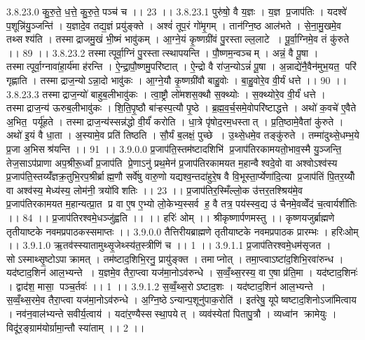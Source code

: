3.8.23.0
कु॒रु॒ते॒ ध॒त्ते॒ कु॒रु॒ते॒ पञ्च॑ च ।। 23 ।।
3.8.23.1
पुरु॑षो॒ वै य॒ज्ञः । य॒ज्ञ प्र॒जाप॑तिः । यदश्वे॑ प॒शून्नि॑यु॒ञ्जन्ति॑ । य॒ज्ञादे॒व तद्य॒ज्ञं प्रयु॑ङ्क्ते । अश्वं॑ तूप॒रं गो॑मृ॒गम् । तान॑ग्नि॒ष्ठ आल॑भते । से॒ना॒मु॒खमे॒व तथ्सश्य॑ति । तस्माद्राजमु॒खं भी॒ष्मं भावु॑कम् । आ॒ग्ने॒यं कृ॒ष्णग्री॑वं पु॒रस्ताल्ल॒लाटे । पू॒र्वा॒ग्निमे॒व तं कु॑रुते ।। 89 ।।
3.8.23.2
तस्मात्पूर्वा॒ग्निं पु॒रस्तात्स्थापयन्ति । पौ॒ष्णम॒न्वञ्चम् । अन्नं॒ वै पू॒षा । तस्मात्पूर्वा॒ग्नावा॑हा॒र्य॑मा ह॑रन्ति । ऐ॒न्द्रा॒पौ॒ष्णमु॒परि॑ष्टात् । ऐ॒न्द्रो वै रा॑ज॒न्योऽन्नं॑ पू॒षा । अ॒न्नाद्ये॑नै॒वैन॑मुभ॒यत॒ परि॑ गृह्णाति । तस्माद्राज॒न्योऽन्ना॒दो भावु॑कः । आ॒ग्ने॒यौ कृ॒ष्णग्री॑वौ बाहु॒वोः । बा॒हु॒वोरे॒व वी॒र्यं धत्ते ।। 90 ।।
3.8.23.3
तस्माद्राज॒न्यो॑ बाहुब॒लीभावु॑कः । त्वा॒ष्ट्रौ लो॑मशस॒क्थौ स॒क्थ्योः । स॒क्थ्योरे॒व वी॒र्यं॑ धत्ते । तस्माद्राज॒न्य॑ ऊरुब॒लीभावु॑कः । शि॒ति॒पृ॒ष्ठौ बा॑ऱ्हस्प॒त्यौ पृ॒ष्ठे । ब्र॒ह्म॒व॒र्च॒समे॒वोपरि॑ष्टाद्धत्ते । अथो॑ क॒वचे॑ ए॒वैते अ॒भित॒ पर्यू॑हते । तस्माद्राज॒न्य॑स्सन्न॑द्धो वी॒र्यं॑ करोति । धा॒त्रे पृ॑षोद॒रम॒धस्तात् । प्र॒ति॒ष्ठामे॒वैतां कु॑रुते । अथो॑ इ॒यं वै धा॒ता । अ॒स्यामे॒व प्रति॑ तिष्ठति । सौ॒र्यं ब॒लक्षं॒ पुच्छे । उ॒थ्से॒धमे॒व तङ्कु॑रुते । तम्मा॑दुथ्से॒धम्भ॒ये प्र॒जा अ॒भिसश्र॑यन्ति ।। 91 ।।
3.9.0.0
प्र॒जाप॑ति॒स्तम॑ष्टादशिभि॑ प्र॒जाप॑तिरकामयतो॒भाव॒स्मै यु॒ञ्जन्ति॒ तेज॒साऽप॑प्राणा अप॒श्रीरू॒र्ध्वां प्र॒जाप॑ति प्रे॒णाऽनु॑ प्रथ॒मेन॑ प्र॒जाप॑तिरकामयत म॒हान्वैश्वदे॒वो वा अश्वोऽश्व॑स्य प्र॒जाप॑ति॒स्तय्यँ॑ज्ञक्र॒तुभि॒रप॒श्रीर्ब्राह्म॒णौ सर्वे॑षु वारु॒णो यद्यश्व॒न्तदा॑हुरे॒ष वै वि॒भूस्ता॒र्प्येणा॑दि॒त्या प्र॒जाप॑तिं पि॒तर॒य्योँ वा अश्व॑स्य॒ मेध्य॑स्य॒ लोम॑नी॒ त्रयो॑विशतिः ।। 23 ।। प्र॒जाप॑तिर॒स्मिँल्लो॒क उ॑त्तर॒तश्श्रिय॑मे॒व प्र॒जाप॑तिरकामयत म॒हान्यत्प्रा॒त प्र वा ए॒ष ए॒भ्यो लो॒केभ्य॒स्सर्व॑ ह॒ वै तत्र॒ पय॑स्स्व॒द्य उ॑ चैनमे॒वव्वेँद॑ च॒त्वार्यशी॑तिः ।। 84 ।। प्र॒जाप॑तिरश्वमे॒धञ्जु॑ह्वति ।। ।। हरिः॑ ओम् ।। श्रीकृष्णार्पणमस्तु ।। कृष्णयजुर्ब्राह्मणे तृतीयाष्टके नवमप्रपाठकस्समाप्तः ।।
3.9.0.0
तैत्तिरीयब्राह्मणे तृतीयाष्टके नवमप्रपाठक प्रारम्भः । हरिःओम् ।।
3.9.1.0
ऋ॒तव॑स्स्यातामुथ्सृ॒जेथ्स्य॑त॒स्त्रीणि॑ च ।। 1 ।।
3.9.1.1
प्र॒जाप॑तिरश्वमे॒धम॑सृजत । सोऽस्माथ्सृ॒ष्टोऽपाक्रामत् । तम॑ष्टाद॒शिभि॒रनु॒ प्रायु॑ङ्क्त । तमाप्नोत् । तमा॒प्त्वाऽष्टा॑द॒शिभि॒रवा॑रुन्ध । यद॑ष्टाद॒शिन॑ आल॒भ्यन्ते । य॒ज्ञमे॒व तैरा॒प्त्वा यज॑मा॒नोऽव॑रुन्धे । स॒व्वँ॒थ्स॒रस्य॒ वा ए॒षा प्र॑ति॒मा । यद॑ष्टाद॒शिनः॑ । द्वाद॑श॒ मासा॒ पञ्च॒र्तवः॑ ।। 1 ।।
3.9.1.2
स॒व्वँ॒थ्स॒रोऽष्टाद॒शः । यद॑ष्टाद॒शिन॑ आल॒भ्यन्ते । स॒व्वँ॒थ्स॒रमे॒व तैरा॒प्त्वा यज॑मा॒नोऽव॑रुन्धे । अ॒ग्नि॒ष्ठेऽन्यान्प॒शूनु॑पाक॒रोति॑ । इत॑रेषु॒ यूपेष्वष्टाद॒शिनोऽजा॑मित्वाय । नव॑न॒वाल॑भ्यन्ते सवीर्य॒त्वाय॑ । यदा॑र॒ण्यैस्स॑स्था॒पयेत् । व्यव॑स्येतां पितापु॒त्रौ । व्यध्वा॑न क्रामेयुः । विदू॑र॒ङ्ग्राम॑योर्ग्रामा॒न्तौ स्या॑ताम् ।। 2 ।।
